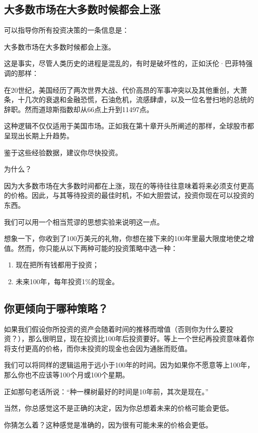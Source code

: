 \subsection{大多数市场在大多数时候都会上涨}
可以指导你所有投资决策的一条信息是：

大多数市场在大多数时候都会上涨。

这是事实，尽管人类历史的进程是混乱的，有时是破坏性的，正如沃伦·巴菲特强调的那样：

在20世纪，美国经历了两次世界大战、代价高昂的军事冲突以及其他重创，大萧条，十几次的衰退和金融恐慌，石油危机，流感肆虐，以及一位名誉扫地的总统的辞职。然而道琼斯指数却从66点上升到11497点。

这种逻辑不仅仅适用于美国市场。正如我在第十章开头所阐述的那样，全球股市都呈现出长期上升趋势。

鉴于这些经验数据，建议你尽快投资。

为什么？

因为大多数市场在大多数时间都在上涨，现在的等待往往意味着将来必须支付更高的价格。因此，与其等待投资的最佳时机，不如大胆尝试，投资你现在可以投资的东西。

我们可以用一个相当荒谬的思想实验来说明这一点。

想象一下，你收到了100万美元的礼物，你想在接下来的100年里最大限度地使之增值。然而，你只能从以下两种可能的投资策略中选一种：

\begin{enumerate}
\item 现在把所有钱都用于投资；
\item 未来100年，每年投资1\%的现金。
\end{enumerate}

\subsection{你更倾向于哪种策略？}
如果我们假设你所投资的资产会随着时间的推移而增值（否则你为什么要投资？），那么很明显，现在投资比100年后投资要好。等上一个世纪再投资意味着你将支付更高的价格，而你未投资的现金也会因为通胀而贬值。

我们可以将同样的逻辑运用于远小于100年的时间。因为如果你不愿意等上100年，那么你也不应该等100个月或100个星期。

正如那句老话所说：“种一棵树最好的时间是10年前，其次是现在。”

当然，你总感觉这不是正确的决定，因为你总想着未来的价格可能会更低。

你猜怎么着？这种感觉是准确的，因为很有可能未来的价格会更低。

